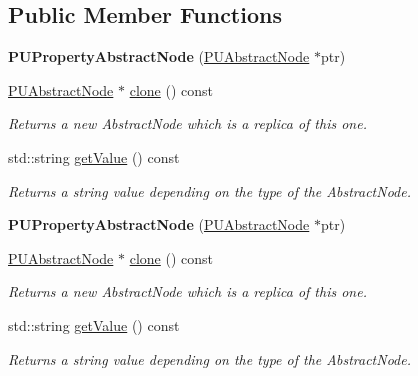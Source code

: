 \subsection*{Public Member Functions}
\begin{DoxyCompactItemize}
\item 
\mbox{\label{classPUPropertyAbstractNode_a27991453d42f0aafac35323001f5c5cc}} 
{\bfseries P\+U\+Property\+Abstract\+Node} (\hyperlink{classPUAbstractNode}{P\+U\+Abstract\+Node} $\ast$ptr)
\item 
\mbox{\label{classPUPropertyAbstractNode_a725d5a8f28329897e9fc1da2a300f722}} 
\hyperlink{classPUAbstractNode}{P\+U\+Abstract\+Node} $\ast$ \hyperlink{classPUPropertyAbstractNode_a725d5a8f28329897e9fc1da2a300f722}{clone} () const
\begin{DoxyCompactList}\small\item\em Returns a new Abstract\+Node which is a replica of this one. \end{DoxyCompactList}\item 
\mbox{\label{classPUPropertyAbstractNode_aa5a669829ce467051ae3fbe502a09734}} 
std\+::string \hyperlink{classPUPropertyAbstractNode_aa5a669829ce467051ae3fbe502a09734}{get\+Value} () const
\begin{DoxyCompactList}\small\item\em Returns a string value depending on the type of the Abstract\+Node. \end{DoxyCompactList}\item 
\mbox{\label{classPUPropertyAbstractNode_a27991453d42f0aafac35323001f5c5cc}} 
{\bfseries P\+U\+Property\+Abstract\+Node} (\hyperlink{classPUAbstractNode}{P\+U\+Abstract\+Node} $\ast$ptr)
\item 
\mbox{\label{classPUPropertyAbstractNode_a3ae6dfabb718779c7706e4c8a1d97e26}} 
\hyperlink{classPUAbstractNode}{P\+U\+Abstract\+Node} $\ast$ \hyperlink{classPUPropertyAbstractNode_a3ae6dfabb718779c7706e4c8a1d97e26}{clone} () const
\begin{DoxyCompactList}\small\item\em Returns a new Abstract\+Node which is a replica of this one. \end{DoxyCompactList}\item 
\mbox{\label{classPUPropertyAbstractNode_aa5a669829ce467051ae3fbe502a09734}} 
std\+::string \hyperlink{classPUPropertyAbstractNode_aa5a669829ce467051ae3fbe502a09734}{get\+Value} () const
\begin{DoxyCompactList}\small\item\em Returns a string value depending on the type of the Abstract\+Node. \end{DoxyCompactList}\end{DoxyCompactItemize}
